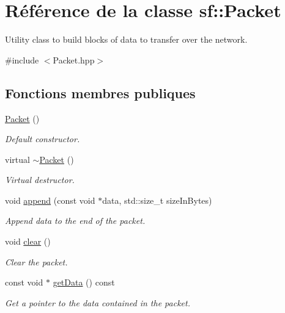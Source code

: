 \hypertarget{classsf_1_1Packet}{}\section{Référence de la classe sf\+:\+:Packet}
\label{classsf_1_1Packet}


Utility class to build blocks of data to transfer over the network.  




{\ttfamily \#include $<$Packet.\+hpp$>$}

\subsection*{Fonctions membres publiques}
\begin{DoxyCompactItemize}
\item 
\hyperlink{classsf_1_1Packet_a786e5d4ced83992ceefa1799963ea858}{Packet} ()
\begin{DoxyCompactList}\small\item\em Default constructor. \end{DoxyCompactList}\item 
\mbox{\label{classsf_1_1Packet_adc0490ca3c7c3d1e321bd742e5213913}} 
virtual \hyperlink{classsf_1_1Packet_adc0490ca3c7c3d1e321bd742e5213913}{$\sim$\+Packet} ()
\begin{DoxyCompactList}\small\item\em Virtual destructor. \end{DoxyCompactList}\item 
void \hyperlink{classsf_1_1Packet_a7dd6e429b87520008326c4d71f1cf011}{append} (const void $\ast$data, std\+::size\+\_\+t size\+In\+Bytes)
\begin{DoxyCompactList}\small\item\em Append data to the end of the packet. \end{DoxyCompactList}\item 
void \hyperlink{classsf_1_1Packet_a133ea8b8fe6e93c230f0d79f19a3bf0d}{clear} ()
\begin{DoxyCompactList}\small\item\em Clear the packet. \end{DoxyCompactList}\item 
const void $\ast$ \hyperlink{classsf_1_1Packet_abfd771803c822f89f187e1fcc2af5afc}{get\+Data} () const
\begin{DoxyCompactList}\small\item\em Get a pointer to the data contained in the packet. \end{DoxyCompactList}\item 

\end{DoxyCompactItemize}
